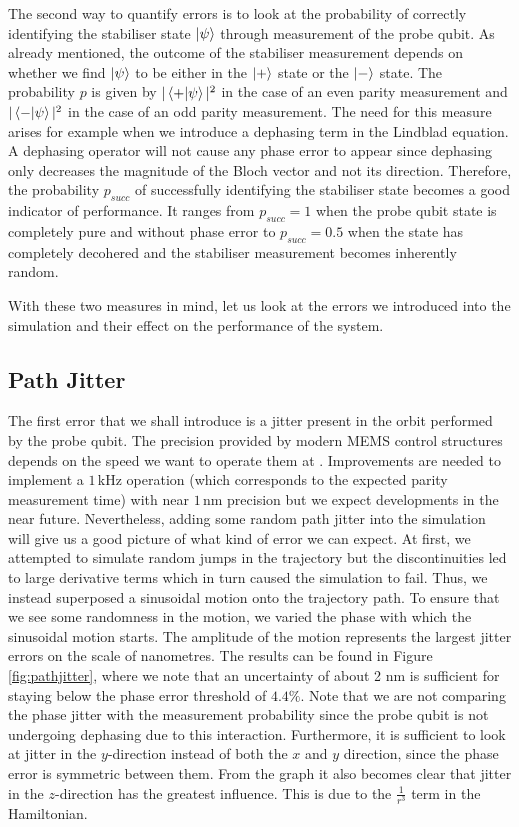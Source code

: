 The second way to quantify errors is to look at the probability of correctly identifying the stabiliser state  $\ket{\psi}$ through measurement of the probe qubit. As already mentioned, the outcome of the stabiliser measurement depends on whether we find $\ket{\psi}$ to be either in the $\ket{+}$ state or the $\ket{-}$ state. The probability $p$ is given by $|\left\langle +|\psi \right\rangle|^2$ in the case of an even parity measurement and $|\left\langle - |\psi \right\rangle|^2$ in the case of an odd parity measurement. The need for this measure arises for example when we introduce a dephasing term in the Lindblad equation. A dephasing operator will not cause any phase error to appear since dephasing only decreases the magnitude of the Bloch vector and not its direction. Therefore, the probability $p_{succ}$ of successfully identifying the stabiliser state becomes a good indicator of performance. It ranges from $p_{succ} = 1$ when the probe qubit state is completely pure and without phase error to $p_{succ} = 0.5$ when the state has completely decohered and the stabiliser measurement becomes inherently random. 

With these two measures in mind, let us look at the errors we introduced into the simulation and their effect on the performance of the system. 




\subsection{Path Jitter}\label{sec:jitter}
The first error that we shall introduce is a jitter present in the orbit performed by the probe qubit. The precision provided by modern MEMS control structures depends on the speed we want to operate them at \cite{Chu2003,Koo2012}. Improvements are needed to implement a $1\, $kHz operation (which corresponds to the expected parity measurement time) with near $1\, $nm precision but we expect developments in the near future. Nevertheless, adding some random path jitter into the simulation will give us a good picture of what kind of error we can expect. At first, we attempted to simulate random jumps in the trajectory but the discontinuities led to large derivative terms which in turn caused the simulation to fail. Thus,  we instead superposed a sinusoidal motion onto the trajectory path. To ensure that we see some randomness in the motion, we varied the phase with which the sinusoidal motion starts. The amplitude of the motion represents the largest jitter errors on the scale of nanometres. The results can be found in Figure \ref{fig:pathjitter}, where we note that an uncertainty of about 2 nm is sufficient for staying below the phase error threshold of $4.4 \%$. Note that we are not comparing the phase jitter with the measurement probability since the probe qubit is not undergoing dephasing due to this interaction. Furthermore, it is sufficient to look at jitter in the $y$-direction instead of both the $x$ and $y$ direction, since the phase error is symmetric between them. 
From the graph it also becomes clear that jitter in the $z$-direction has the greatest influence. This is due to the $\frac{1}{r^3}$  term in the Hamiltonian.



